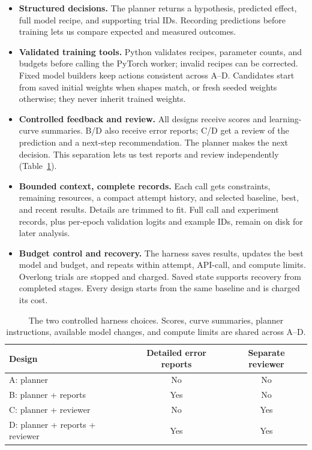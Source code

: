 \documentclass{article}
\begin{document}
\begin{itemize}
\item \textbf{Structured decisions.} The planner returns a hypothesis, predicted effect, full model recipe, and supporting trial IDs. Recording predictions before training lets us compare expected and measured outcomes.
\item \textbf{Validated training tools.} Python validates recipes, parameter counts, and budgets before calling the PyTorch worker; invalid recipes can be corrected. Fixed model builders keep actions consistent across A--D. Candidates start from saved initial weights when shapes match, or fresh seeded weights otherwise; they never inherit trained weights.
\item \textbf{Controlled feedback and review.} All designs receive scores and learning-curve summaries. B/D also receive error reports; C/D get a review of the prediction and a next-step recommendation. The planner makes the next decision. This separation lets us test reports and review independently (Table~\ref{tab:designs}).
\item \textbf{Bounded context, complete records.} Each call gets constraints, remaining resources, a compact attempt history, and selected baseline, best, and recent results. Details are trimmed to fit. Full call and experiment records, plus per-epoch validation logits and example IDs, remain on disk for later analysis.
\item \textbf{Budget control and recovery.} The harness saves results, updates the best model and budget, and repeats within attempt, API-call, and compute limits. Overlong trials are stopped and charged. Saved state supports recovery from completed stages. Every design starts from the same baseline and is charged its cost.
\end{itemize}

\begin{table}[h]
\caption{The two controlled harness choices. Scores, curve summaries, planner instructions, available model changes, and compute limits are shared across A--D.}
\label{tab:designs}
\centering
\begin{tabular}{@{}lcc@{}}
\toprule
\textbf{Design} & \textbf{Detailed error reports} & \textbf{Separate reviewer}\\
\midrule
A: planner & No & No\\
B: planner + reports & Yes & No\\
C: planner + reviewer & No & Yes\\
D: planner + reports + reviewer & Yes & Yes\\
\bottomrule
\end{tabular}
\end{table}
\end{document}
